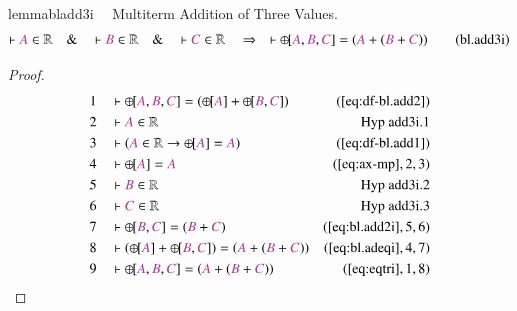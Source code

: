 \begin{restatable}{lemma}{bladd3i}~~ Multiterm Addition of Three Values.
\begin{align}
\vdash \mc{A} \in \mathbb{R}\quad\&\quad \vdash \mc{B} \in
    \mathbb{R}\quad\&\quad \vdash \mc{C} \in \mathbb{R}\quad\Rightarrow\quad
    \vdash {\oplus\hspace{-1pt}[} \mc{A} , \mc{B} , \mc{C} ] = ( \mc{A} + (
    \mc{B} + \mc{C} ) )\label{eq:bl.add3i}\tag{bl.add3i}
\end{align}
\end{restatable}

\begin{proof}
\begin{align}
  1 &&  & \vdash {\oplus\hspace{-1pt}[} \mc{A} , \mc{B} , \mc{C} ] = (
      {\oplus\hspace{-1pt}[} \mc{A} ] +
      {\oplus\hspace{-1pt}[} \mc{B} , \mc{C} ]
      )&(\mbox{\ref{eq:df-bl.add2}})\notag
  \\ 2 &&  & \vdash \mc{A} \in \mathbb{R}&\text{Hyp~add3i.1}\notag%
  \\ 3 &&  & \vdash ( \mc{A} \in \mathbb{R} \rightarrow {\oplus\hspace{-1pt}[}
      \mc{A} ] = \mc{A}
      )&(\mbox{\ref{eq:df-bl.add1}})\notag
  \\ 4 &&  & \vdash {\oplus\hspace{-1pt}[} \mc{A} ] =
      \mc{A}&(\mbox{\ref{eq:ax-mp}},2,3)\notag
  \\ 5 &&  & \vdash \mc{B} \in \mathbb{R}&\text{Hyp~add3i.2}\notag%
  \\ 6 &&  & \vdash \mc{C} \in \mathbb{R}&\text{Hyp~add3i.3}\notag%
  \\ 7 &&  & \vdash {\oplus\hspace{-1pt}[} \mc{B} , \mc{C} ] = ( \mc{B} +
      \mc{C} )&(\mbox{\ref{eq:bl.add2i}},5,6)\notag
  \\ 8 &&  & \vdash ( {\oplus\hspace{-1pt}[} \mc{A} ] + {\oplus\hspace{-1pt}[}
      \mc{B} , \mc{C} ] ) = ( \mc{A} + ( \mc{B} + \mc{C} )
      )&(\mbox{\ref{eq:bl.adeqi}},4,7)\notag
  \\ 9 &&  & \vdash {\oplus\hspace{-1pt}[} \mc{A} , \mc{B} , \mc{C} ] = (
      \mc{A} + ( \mc{B} + \mc{C} )
      )&(\mbox{\ref{eq:eqtri}},1,8)\notag
\end{align}
\end{proof}

